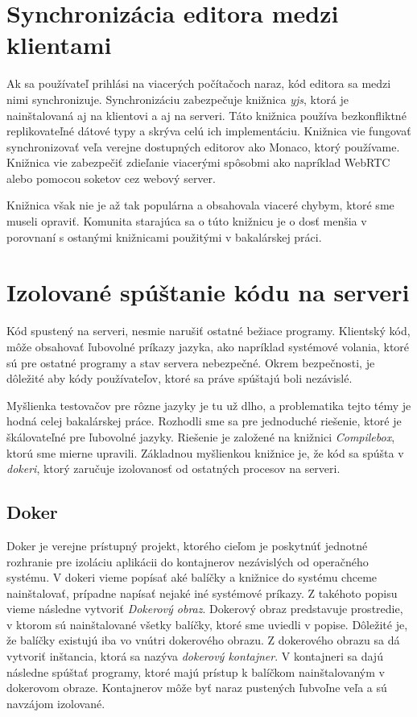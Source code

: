 \section{Synchronizácia editora medzi klientami}
Ak sa používateľ prihlási na viacerých počítačoch naraz, kód editora sa medzi nimi synchronizuje.
Synchronizáciu zabezpečuje knižnica \textit{yjs}, ktorá je nainštalovaná aj na klientovi a aj na
serveri. Táto knižnica používa bezkonfliktné replikovateľné dátové typy a skrýva celú ich
implementáciu. Knižnica vie fungovať synchronizovať veľa verejne dostupných editorov ako Monaco,
ktorý používame. Knižnica vie zabezpečiť zdieľanie viacerými spôsobmi ako napríklad WebRTC alebo
pomocou soketov cez webový server. 

Knižnica však nie je až tak populárna a obsahovala viaceré chybym, ktoré sme museli opraviť.
Komunita starajúca sa o túto knižnicu je o dosť menšia v porovnaní s ostanými knižnicami použitými v
bakalárskej práci.

\section{Izolované spúštanie kódu na serveri}
Kód spustený na serveri, nesmie narušiť ostatné bežiace programy. Klientský kód, môže obsahovať
ľubovolné príkazy jazyka, ako napríklad systémové volania, ktoré sú pre ostatné programy a stav
servera nebezpečné. Okrem bezpečnosti, je dôležité aby kódy používateľov, ktoré sa práve spúštajú
boli nezávislé.

Myšlienka testovačov pre rôzne jazyky je tu už dlho, a problematika tejto témy je hodná celej
bakalárskej práce. Rozhodli sme sa pre jednoduché riešenie, ktoré je škálovateľné pre ľubovolné
jazyky. Riešenie je založené na knižnici \textit{Compilebox}, ktorú sme mierne upravili. Základnou
myšlienkou knižnice je, že kód sa spúšta v \textit{dokeri}, ktorý zaručuje izolovanosť od ostatných
procesov na serveri. 

\subsection{Doker}
Doker je verejne prístupný projekt, ktorého cieľom je poskytnúť jednotné rozhranie pre izoláciu
aplikácii do kontajnerov nezávislých od operačného systému. V dokeri vieme popísať aké balíčky a
knižnice do systému chceme nainštalovať, prípadne napísať nejaké iné systémové príkazy. Z takéhoto
popisu vieme následne vytvoriť \textit{Dokerový obraz}. Dokerový obraz predstavuje prostredie, v
ktorom sú nainštalované všetky balíčky, ktoré sme uviedli v popise. Dôležité je, že balíčky existujú
iba vo vnútri dokerového obrazu. Z dokerového obrazu sa dá vytvoriť inštancia, ktorá sa nazýva
\textit{dokerový kontajner}. V kontajneri sa dajú následne spúštať programy, ktoré majú prístup k
balíčkom nainštalovaným v dokerovom obraze. Kontajnerov môže byť naraz pustených ľubvoľne veľa a sú
navzájom izolované. 

